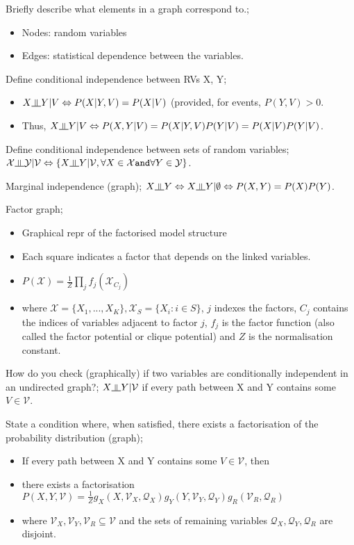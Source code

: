 \documentclass{article}
\newcommand{\indep}{\rotatebox[origin=c]{90}{$\models$}}
\newcommand{\CI}{\mathrel{\text{\scalebox{1.07}{$\perp\mkern-10mu\perp$}}}}
\begin{document}
\indep
\CI
{\perp\!\!\!\perp}

Briefly describe what elements in a graph correspond to.; \begin{itemize} \item Nodes: random variables \item Edges: statistical dependence between the variables.  \end{itemize}

Define conditional independence between RVs X, Y; \begin{itemize} \item $X\indep Y|V \Leftrightarrow P(X|Y, V) = P(X|V)$ (provided, for events, $P(Y,V)>0$.  \item Thus, $X\indep Y|V \Leftrightarrow P(X,Y|V)=P(X|Y,V)P(Y|V)=P(X|V)P(Y|V)$.  \end{itemize}

Define conditional independence between sets of random variables; $\mathcal{X} \indep \mathcal{Y}|\mathcal{V} \Leftrightarrow \{X\indep Y | \mathcal{V}, \forall X \in \mathcal{X} \mathtt{ and }\forall Y \in \mathcal{Y}\}$.

Marginal independence (graph); $X\indep Y \Leftrightarrow X \indep Y | \emptyset \Leftrightarrow P(X,Y) = P(X)P(Y)$.

Factor graph; \begin{itemize} \item Graphical repr of the factorised model structure \item Each square indicates a factor that depends on the linked variables.  \item $P(\mathcal{X})=\frac{1}{Z}\prod_j f_j(\mathcal{X}_{C_j})$ \item where $\mathcal{X}=\{X_1,...,X_K\}, \mathcal{X}_S=\{X_i:i\in S\}$, $j$ indexes the factors, $C_j$ contains the indices of variables adjacent to factor $j$, $f_j$ is the factor function (also called the factor potential or clique potential) and $Z$ is the normalisation constant.  \end{itemize}

How do you check (graphically) if two variables are conditionally independent in an undirected graph?; $X\indep Y|\mathcal{V}$ if every path between X and Y contains some $V\in\mathcal{V}$.

State a condition where, when satisfied, there exists a factorisation of the probability distribution (graph); \begin{itemize} \item If every path between X and Y contains some $V\in\mathcal{V}$, then \item there exists a factorisation $P(X,Y,\mathcal{V})=\frac{1}{Z}g_X(X,\mathcal{V}_X, \mathcal{Q}_X)g_Y(Y,\mathcal{V}_Y, \mathcal{Q}_Y)g_R(\mathcal{V}_R, \mathcal{Q}_R)$ \item where $\mathcal{V}_X, \mathcal{V}_Y, \mathcal{V}_R \subseteq \mathcal{V}$ and the sets of remaining variables $\mathcal{Q}_X,\mathcal{Q}_Y,\mathcal{Q}_R$ are disjoint.  \end{itemize}
\end{document}
